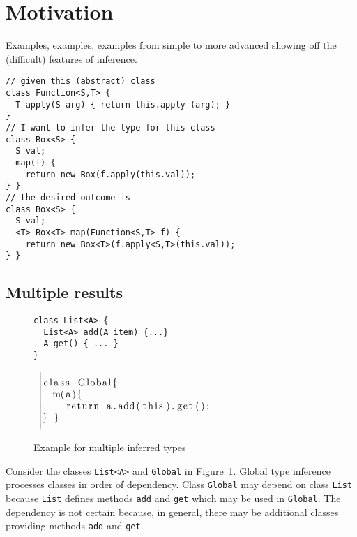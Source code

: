 \section{Motivation}
\label{sec:motivation}

Examples, examples, examples from simple to more advanced showing off
the (difficult) features of inference.

\begin{lstlisting}
// given this (abstract) class
class Function<S,T> {
  T apply(S arg) { return this.apply (arg); }
}
// I want to infer the type for this class
class Box<S> {
  S val;
  map(f) {
    return new Box(f.apply(this.val));
} }
// the desired outcome is
class Box<S> {
  S val;
  <T> Box<T> map(Function<S,T> f) {
    return new Box<T>(f.apply<S,T>(this.val));
} }
\end{lstlisting}

\subsection{Multiple results}
\label{sec:multiple-results}
\begin{figure}[tp]
  \begin{minipage}{0.49\linewidth}
\begin{lstlisting}
class List<A> {
  List<A> add(A item) {...}
  A get() { ... }
}
\end{lstlisting}
  \end{minipage}
  ~$\left|
  \begin{minipage}{0.49\linewidth}
\begin{lstlisting}
class Global{
  m(a){
    return a.add(this).get();
} }
\end{lstlisting}
  \end{minipage}\right.$
  \caption{Example for multiple inferred types}
  \label{fig:example-types-not-unique}
\end{figure}
Consider the classes \texttt{List<A>} and \texttt{Global} in Figure~\ref{fig:example-types-not-unique}.
Global type inference processes classes in order of
dependency. Class \texttt{Global} may depend on
class \texttt{List} because \texttt{List} defines methods \texttt{add} and
\texttt{get} which may be used in \texttt{Global}. The dependency is
not certain because, in general, there may be additional classes
providing methods \texttt{add} and \texttt{get}.

